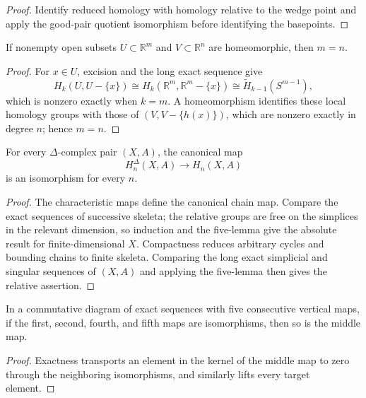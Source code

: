 \begin{proof}
\sketch Identify reduced homology with homology relative to the wedge point and
apply the good-pair quotient isomorphism before identifying the basepoints.
\end{proof}

\begin{theorem}
\label{thm:invariance-of-dimension}
If nonempty open subsets $U\subset\mathbb{R}^m$ and
$V\subset\mathbb{R}^n$ are homeomorphic, then $m=n$.
\end{theorem}
\begin{proof}
\sketch For $x\in U$, excision and the long exact sequence give
\[
H_k(U,U-\{x\})\cong H_k(\mathbb{R}^m,\mathbb{R}^m-\{x\})
\cong\widetilde H_{k-1}(S^{m-1}),
\]
which is nonzero exactly when $k=m$. A homeomorphism identifies these local
homology groups with those of $(V,V-\{h(x)\})$, which are nonzero exactly in
degree $n$; hence $m=n$.
\end{proof}

\begin{theorem}
\label{thm:simplicial-singular-homology-isomorphic}
For every $\Delta$-complex pair $(X,A)$, the canonical map
\[
H_n^\Delta(X,A)\longrightarrow H_n(X,A)
\]
is an isomorphism for every $n$.
\end{theorem}
\begin{proof}
\sketch The characteristic maps define the canonical chain map. Compare the
exact sequences of successive skeleta; the relative groups are free on the
simplices in the relevant dimension, so induction and the five-lemma give the
absolute result for finite-dimensional $X$. Compactness reduces arbitrary
cycles and bounding chains to finite skeleta. Comparing the long exact
simplicial and singular sequences of $(X,A)$ and applying the five-lemma then
gives the relative assertion.
\end{proof}

\begin{lemma}
\label{lem:five-lemma}
\uses{}
In a commutative diagram of exact sequences with five consecutive vertical maps, if the first, second, fourth, and fifth maps are isomorphisms, then so is the middle map.
\end{lemma}
\begin{proof}
\sketch Exactness transports an element in the kernel of the middle map to zero through the neighboring isomorphisms, and similarly lifts every target element.
\end{proof}

